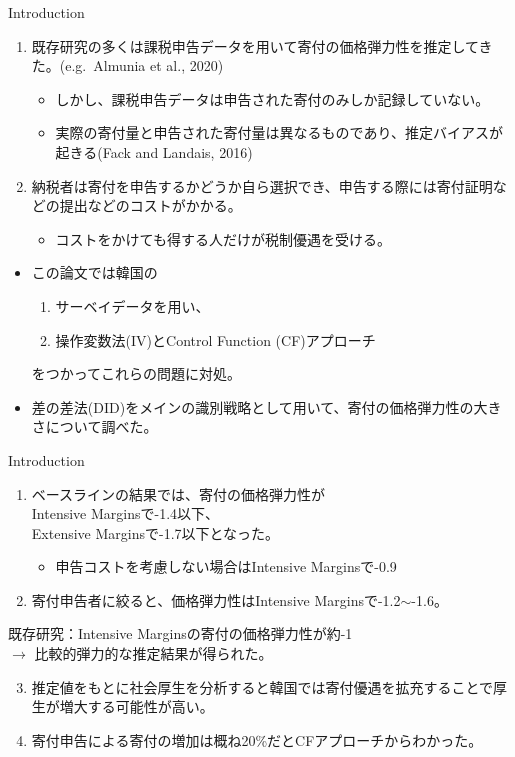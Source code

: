 \documentclass[dvipdfmx,10pt]{beamer}
\begin{document}
	\begin{frame}{Introduction}
		\protect\hypertarget{introduction-1}{}
		\begin{enumerate}
			\item 既存研究の多くは課税申告データを用いて寄付の価格弾力性を推定してきた。(e.g.~Almunia et al., 2020)
			\begin{itemize}
				\item しかし、課税申告データは申告された寄付のみしか記録していない。
				\item 実際の寄付量と申告された寄付量は異なるものであり、推定バイアスが起きる(Fack and Landais, 2016)
			\end{itemize}
			\item 納税者は寄付を申告するかどうか自ら選択でき、申告する際には寄付証明などの提出などのコストがかかる。
			\begin{itemize}
				\item コストをかけても得する人だけが税制優遇を受ける。
			\end{itemize}
		\end{enumerate}
	\begin{itemize}
		\item この論文では韓国の
		\begin{enumerate}
			\item サーベイデータを用い、
			\item 操作変数法(IV)とControl Function (CF)アプローチ
		\end{enumerate}
		\flushright	をつかってこれらの問題に対処。
		\flushleft
		\item 差の差法(DID)をメインの識別戦略として用いて、寄付の価格弾力性の大きさについて調べた。
		\end{itemize}
	\end{frame}
	
	\begin{frame}{Introduction}
		\protect\hypertarget{introduction-2}{}
		\begin{enumerate}
			\item ベースラインの結果では、寄付の価格弾力性が\\
			Intensive Marginsで-1.4以下、\\
			Extensive Marginsで-1.7以下となった。
			\begin{itemize}
				\item 申告コストを考慮しない場合はIntensive Marginsで-0.9
			\end{itemize}
			\item 寄付申告者に絞ると、価格弾力性はIntensive Marginsで-1.2\(\sim\)-1.6。
		\end{enumerate}
		既存研究：Intensive Marginsの寄付の価格弾力性が約-1\\
		$\to$ 比較的弾力的な推定結果が得られた。\\
		\begin{enumerate}
			\setcounter{enumi}{2}
			\item 推定値をもとに社会厚生を分析すると韓国では寄付優遇を拡充することで厚生が増大する可能性が高い。
			\item 寄付申告による寄付の増加は概ね20\%だとCFアプローチからわかった。
		\end{enumerate}
	\end{frame}
	
\end{document}
